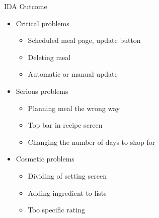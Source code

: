 \begin{frame}{IDA Outcome}
    \begin{itemize}
	\item Critical problems
		\begin{itemize}
			\item Scheduled meal page, update button
			\item Deleting meal
			\item Automatic or manual update
		\end{itemize}
	\item Serious problems
		\begin{itemize}
			\item Planning meal the wrong way
			\item Top bar in recipe screen
			\item Changing the number of days to shop for 
		\end{itemize}
	\item Cosmetic problems
		\begin{itemize}
			\item Dividing of setting screen
			\item Adding ingredient to lists
			\item Too specific rating
		\end{itemize}
    \end{itemize}
\end{frame}

